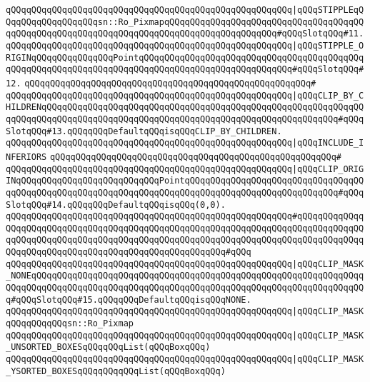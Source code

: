 \verb|qQQqqQQqqQQqqQQqqQQqqQQqqQQqqQQqqQQqqQQqqQQqqQQqqQQqqQQq|\verb#|qQQqSTIPPLEqQQqqQQqqQQqqQQqqQQqsn::Ro_PixmapqQQqqQQqqQQqqQQqqQQqqQQqqQQqqQQqqQQqqQQqqQQqqQQqqQQqqQQqqQQqqQQqqQQqqQQqqQQqqQQqqQQqqQQqqQQq#\verb|#qQQqSlotqQQq#11.|\newline
\verb|qQQqqQQqqQQqqQQqqQQqqQQqqQQqqQQqqQQqqQQqqQQqqQQqqQQqqQQq|\verb#|qQQqSTIPPLE_ORIGINqQQqqQQqqQQqqQQqPointqQQqqQQqqQQqqQQqqQQqqQQqqQQqqQQqqQQqqQQqqQQqqQQqqQQqqQQqqQQqqQQqqQQqqQQqqQQqqQQqqQQqqQQqqQQqqQQqqQQq#\verb|#qQQqSlotqQQq#12.|\newline
\verb|qQQqqQQqqQQqqQQqqQQqqQQqqQQqqQQqqQQqqQQqqQQqqQQqqQQqqQQq#|\newline
\verb|qQQqqQQqqQQqqQQqqQQqqQQqqQQqqQQqqQQqqQQqqQQqqQQqqQQqqQQq|\verb#|qQQqCLIP_BY_CHILDRENqQQqqQQqqQQqqQQqqQQqqQQqqQQqqQQqqQQqqQQqqQQqqQQqqQQqqQQqqQQqqQQqqQQqqQQqqQQqqQQqqQQqqQQqqQQqqQQqqQQqqQQqqQQqqQQqqQQqqQQqqQQqqQQq#\verb|#qQQqSlotqQQq#13.qQQqqQQqDefaultqQQqisqQQqCLIP_BY_CHILDREN.|\newline
\verb|qQQqqQQqqQQqqQQqqQQqqQQqqQQqqQQqqQQqqQQqqQQqqQQqqQQqqQQq|\verb#|qQQqINCLUDE_INFERIORS#\newline
\verb|qQQqqQQqqQQqqQQqqQQqqQQqqQQqqQQqqQQqqQQqqQQqqQQqqQQqqQQq#|\newline
\verb|qQQqqQQqqQQqqQQqqQQqqQQqqQQqqQQqqQQqqQQqqQQqqQQqqQQqqQQq|\verb#|qQQqCLIP_ORIGINqQQqqQQqqQQqqQQqqQQqqQQqqQQqPointqQQqqQQqqQQqqQQqqQQqqQQqqQQqqQQqqQQqqQQqqQQqqQQqqQQqqQQqqQQqqQQqqQQqqQQqqQQqqQQqqQQqqQQqqQQqqQQqqQQq#\verb|#qQQqSlotqQQq#14.qQQqqQQqDefaultqQQqisqQQq(0,0).|\newline
\verb|qQQqqQQqqQQqqQQqqQQqqQQqqQQqqQQqqQQqqQQqqQQqqQQqqQQqqQQq#qQQqqQQqqQQqqQQqqQQqqQQqqQQqqQQqqQQqqQQqqQQqqQQqqQQqqQQqqQQqqQQqqQQqqQQqqQQqqQQqqQQqqQQqqQQqqQQqqQQqqQQqqQQqqQQqqQQqqQQqqQQqqQQqqQQqqQQqqQQqqQQqqQQqqQQqqQQqqQQqqQQqqQQqqQQqqQQqqQQqqQQqqQQqqQQqqQQq#qQQq|\newline
\verb|qQQqqQQqqQQqqQQqqQQqqQQqqQQqqQQqqQQqqQQqqQQqqQQqqQQqqQQq|\verb#|qQQqCLIP_MASK_NONEqQQqqQQqqQQqqQQqqQQqqQQqqQQqqQQqqQQqqQQqqQQqqQQqqQQqqQQqqQQqqQQqqQQqqQQqqQQqqQQqqQQqqQQqqQQqqQQqqQQqqQQqqQQqqQQqqQQqqQQqqQQqqQQqqQQqqQQq#\verb|#qQQqSlotqQQq#15.qQQqqQQqDefaultqQQqisqQQqNONE.|\newline
\verb|qQQqqQQqqQQqqQQqqQQqqQQqqQQqqQQqqQQqqQQqqQQqqQQqqQQqqQQq|\verb#|qQQqCLIP_MASKqQQqqQQqqQQqsn::Ro_Pixmap#\newline
\verb|qQQqqQQqqQQqqQQqqQQqqQQqqQQqqQQqqQQqqQQqqQQqqQQqqQQqqQQq|\verb#|qQQqCLIP_MASK_UNSORTED_BOXESqQQqqQQqList(qQQqBoxqQQq)#\newline
\verb|qQQqqQQqqQQqqQQqqQQqqQQqqQQqqQQqqQQqqQQqqQQqqQQqqQQqqQQq|\verb#|qQQqCLIP_MASK_YSORTED_BOXESqQQqqQQqqQQqList(qQQqBoxqQQq)#\newline

